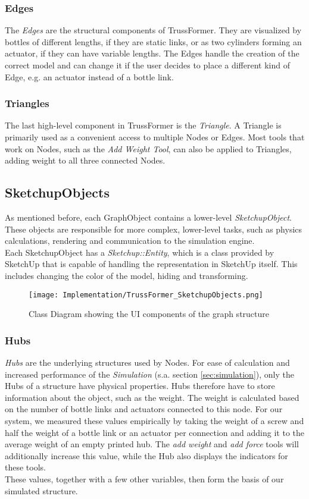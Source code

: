 \subsubsection{Edges}
The \textit{Edges} are the structural components of TrussFormer. They are visualized by bottles of different lengths, if they are static links, or as two cylinders forming an actuator, if they can have variable lengths. The Edges handle the creation of the correct model and can change it if the user decides to place a different kind of Edge, e.g. an actuator instead of a bottle link.

\subsubsection{Triangles}
The last high-level component in TrussFormer is the \textit{Triangle}. A Triangle is primarily used as a convenient access to multiple Nodes or Edges. Most tools that work on Nodes, such as the \textit{Add Weight Tool}, can also be applied to Triangles, adding weight to all three connected Nodes.

\subsection{SketchupObjects}
As mentioned before, each GraphObject contains a lower-level \textit{Sketch\-up\-Ob\-ject}. These objects are responsible for more complex, lower-level tasks, such as physics calculations, rendering and communication to the simulation engine.\\
Each SketchupObject has a \textit{Sketchup::Entity}, which is a class provided by SketchUp that is capable of handling the representation in Sketch\-Up itself. This includes changing the color of the model, hiding and transforming.
\begin{figure}[ht!]
    \texttt{[image: Implementation/TrussFormer\_SketchupObjects.png]}
    \centering
    \caption{Class Diagram showing the UI components of the graph structure}
    \label{fig:sketchup_objects}
\end{figure}

\subsubsection{Hubs}
\textit{Hubs} are the underlying structures used by Nodes. For ease of calculation and increased performance of the \textit{Simulation} (s.a. section \ref{sec:simulation}), only the Hubs of a structure have physical properties. Hubs therefore have to store information about the object, such as the weight. The weight is calculated based on the number of bottle links and actuators connected to this node. For our system, we measured these values empirically by taking the weight of a screw and half the weight of a bottle link or an actuator per connection and adding it to the average weight of an empty printed hub. The \textit{add weight} and \textit{add force} tools will additionally increase this value, while the Hub also displays the indicators for these tools.\\
These values, together with a few other variables, then form the basis of our simulated structure.

